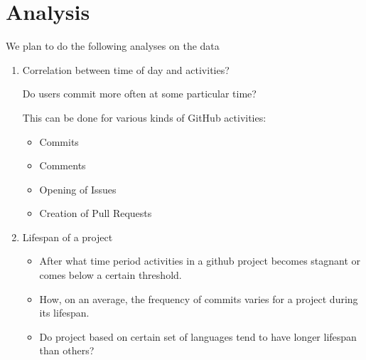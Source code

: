 \newpage
\section{Analysis}

We plan to do the following analyses on the data

\begin{enumerate}

   \item Correlation between time of day and activities?
        
        Do users commit more often at some particular time?

        \bigbreak
        
        This can be done for various kinds of GitHub activities:
           \begin{itemize}
                \item Commits
                \item Comments
                \item Opening of Issues
                \item Creation of Pull Requests
           \end{itemize}

      
    \item Lifespan of a project
            
          \begin{itemize}
              \item After what time period activities in a github project becomes stagnant or comes below a certain threshold.
              \item How, on an average, the frequency of commits varies for a project during its lifespan. %
              \item Do project based on certain set of languages tend to have longer lifespan than others?
          \end{itemize}
      
        


\end{enumerate}
